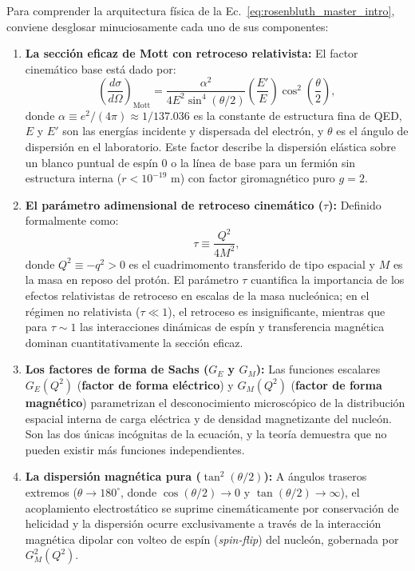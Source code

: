 \documentclass[10pt,a4paper]{article}
\begin{document}
Para comprender la arquitectura física de la Ec.~\eqref{eq:rosenbluth_master_intro}, conviene desglosar minuciosamente cada uno de sus componentes:
\begin{enumerate}
    \item \textbf{La sección eficaz de Mott con retroceso relativista:} El factor cinemático base está dado por:
    \begin{equation}
    \left(\frac{d\sigma}{d\Omega}\right)_{\text{Mott}} = \frac{\alpha^2}{4 E^2 \sin^4(\theta/2)} \left(\frac{E'}{E}\right) \cos^2\left(\frac{\theta}{2}\right),
    \label{eq:mott_recoil_intro}
    \end{equation}
    donde $\alpha \equiv e^2/(4\pi) \approx 1/137.036$ es la constante de estructura fina de QED, $E$ y $E'$ son las energías incidente y dispersada del electrón, y $\theta$ es el ángulo de dispersión en el laboratorio. Este factor describe la dispersión elástica sobre un blanco puntual de espín 0 o la línea de base para un fermión sin estructura interna ($r < 10^{-19}\text{ m}$) con factor giromagnético puro $g=2$.
    \item \textbf{El parámetro adimensional de retroceso cinemático ($\tau$):} Definido formalmente como:
    \begin{equation}
    \tau \equiv \frac{Q^2}{4M^2},
    \label{eq:tau_def_intro}
    \end{equation}
    donde $Q^2 \equiv -q^2 > 0$ es el cuadrimomento transferido de tipo espacial y $M$ es la masa en reposo del protón. El parámetro $\tau$ cuantifica la importancia de los efectos relativistas de retroceso en escalas de la masa nucleónica; en el régimen no relativista ($\tau \ll 1$), el retroceso es insignificante, mientras que para $\tau \sim 1$ las interacciones dinámicas de espín y transferencia magnética dominan cuantitativamente la sección eficaz.
    \item \textbf{Los factores de forma de Sachs ($G_E$ y $G_M$):} Las funciones escalares $G_E(Q^2)$ (\textbf{factor de forma eléctrico}) y $G_M(Q^2)$ (\textbf{factor de forma magnético}) parametrizan el desconocimiento microscópico de la distribución espacial interna de carga eléctrica y de densidad magnetizante del nucleón. Son las dos únicas incógnitas de la ecuación, y la teoría demuestra que no pueden existir más funciones independientes.
    \item \textbf{La dispersión magnética pura ($\tan^2(\theta/2)$):} A ángulos traseros extremos ($\theta \to 180^\circ$, donde $\cos(\theta/2) \to 0$ y $\tan(\theta/2) \to \infty$), el acoplamiento electrostático se suprime cinemáticamente por conservación de helicidad y la dispersión ocurre exclusivamente a través de la interacción magnética dipolar con volteo de espín (\textit{spin-flip}) del nucleón, gobernada por $G_M^2(Q^2)$.

\end{enumerate}
\end{document}
